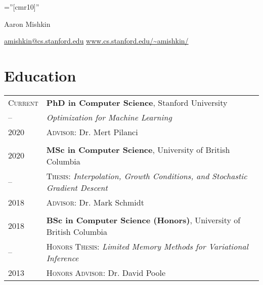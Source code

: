 \documentclass[10pt]{article}
\newcommand{\spacing}{\vspace{0.5cm}}
\begin{document}
\pagestyle{empty} %

\font\fb=''[cmr10]'' %

\par{\centering
{\Huge Aaron Mishkin} \par \vspace{0.25cm}
{\href{mailto:amishkin@cs.stanford.edu}{amishkin@cs.stanford.edu} \hspace{0.2cm} \href{https://cs.stanford.edu/~amishkin/}{www.cs.stanford.edu/\~{}amishkin/}} \par}

\spacing

\section{Education}
\begin{tabular}
    {R{1.8cm}|p{11cm}}
    \textsc{Current}      & \textbf{PhD in Computer Science}, Stanford University      \\
    { -- \hspace{0.2cm} } & \textit{Optimization for Machine Learning}                 \\
    \textsc{2020}         & \textsc{Advisor:}
    Dr.
    Mert Pilanci                                                                       \\  \\ \textsc{2020} & \textbf{MSc in
    Computer Science}, University of British Columbia                                  \\ { -- \hspace{0.2cm} } &
       \textsc{Thesis}: \textit{Interpolation, Growth Conditions, and Stochastic
    Gradient Descent}                                                                  \\ \textsc{2018} & \textsc{Advisor:} Dr.
    Mark Schmidt                                                                       \\  \\ \textsc{2018} & \textbf{BSc in
    Computer Science (Honors)}, University of British Columbia                         \\ { --
    \hspace{0.2cm} }      & \textsc{Honors Thesis:} \textit{Limited Memory Methods for
    Variational Inference}                                                             \\ \textsc{2013} & \textsc{Honors Advisor:} Dr.
       David Poole
\end{tabular}
\end{document}
